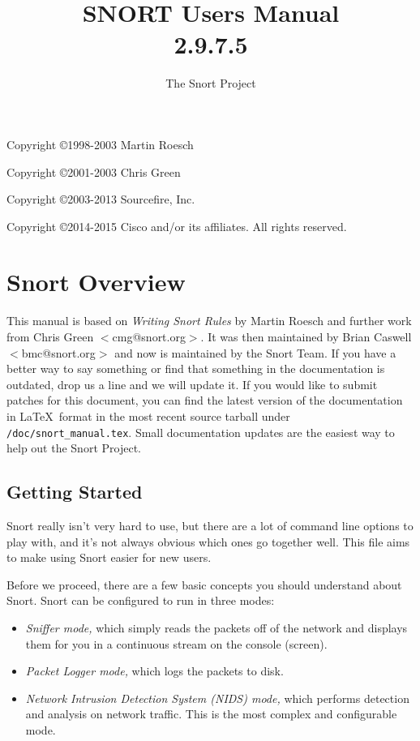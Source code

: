 \documentclass[english]{report}
\begin{document}
\title{SNORT\textsuperscript{\textregistered} Users Manual\\2.9.7.5}

\author{The Snort Project}

\maketitle

\newpage

Copyright \copyright 1998-2003 Martin Roesch

Copyright \copyright 2001-2003 Chris Green

Copyright \copyright 2003-2013 Sourcefire, Inc.

Copyright \copyright 2014-2015 Cisco and/or its affiliates. All rights reserved.

\tableofcontents{}

\chapter{Snort Overview}

This manual is based on \emph{Writing Snort Rules} by Martin Roesch and further
work from Chris Green $<$cmg@snort.org$>$.  It was then maintained by Brian
Caswell $<$bmc@snort.org$>$ and now is maintained by the Snort Team.  If you
have a better way to say something or find that something in the documentation
is outdated, drop us a line and we will update it.  If you would like to submit
patches for this document, you can find the latest version of the documentation
in \LaTeX\ format in the most recent source tarball under
\verb!/doc/snort_manual.tex!.  Small documentation updates are the easiest way
to help out the Snort Project.

\section{Getting Started}

Snort really isn't very hard to use, but there are a lot of command line
options to play with, and it's not always obvious which ones go together well.
This file aims to make using Snort easier for new users.

Before we proceed, there are a few basic concepts you should understand about
Snort. Snort can be configured to run in three modes:

\begin{itemize}

\item {\em Sniffer mode,} which simply reads the packets off of the network and
displays them for you in a continuous stream on the console (screen). 

\item {\em Packet Logger mode,} which logs the packets to disk. 

\item {\em Network Intrusion Detection System (NIDS) mode,} which performs
detection and analysis on network traffic. This is the most complex and
configurable mode.

\end{itemize}
\end{document}
